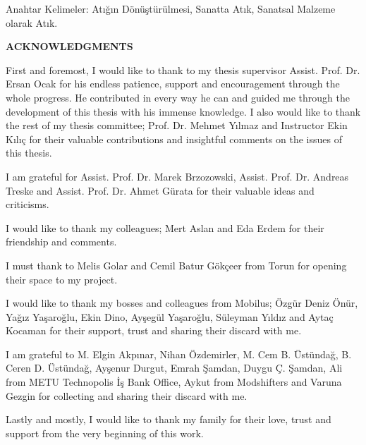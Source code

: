 \documentclass[12pt]{report}
\begin{document}
\noindent Anahtar Kelimeler: Atığın Dönüştürülmesi, Sanatta Atık, Sanatsal Malzeme olarak Atık.
\clearpage


\thispagestyle{plain}
{}
\doublespacing
\begin{center}
	\vspace*{8mm}
	{\fontsize{14pt}{14pt}\selectfont \textbf{\MakeUppercase{ACKNOWLEDGMENTS}}}\\
    \vspace{3\baselineskip}
\end{center}
\par First and foremost, I would like to thank to my thesis supervisor Assist. Prof. Dr. Ersan Ocak for his endless patience, support and encouragement through the whole progress. He contributed in every way he can and guided me through the development of this thesis with his immense knowledge. I also would like to thank the rest of my thesis committee; Prof. Dr. Mehmet Yılmaz and Instructor Ekin Kılıç for their valuable contributions and insightful comments on the issues of this thesis.

I am grateful for Assist. Prof. Dr. Marek Brzozowski, Assist. Prof. Dr. Andreas Treske and Assist. Prof. Dr. Ahmet Gürata for their valuable ideas and criticisms.

I would like to thank my colleagues; Mert Aslan and Eda Erdem for their friendship and comments. 

I must thank to Melis Golar and Cemil Batur Gökçeer from Torun for opening their space to my project. 

I would like to thank my bosses and colleagues from Mobilus; Özgür Deniz Önür, Yağız Yaşaroğlu, Ekin Dino, Ayşegül Yaşaroğlu, Süleyman Yıldız and Aytaç Kocaman for their support, trust and sharing their discard with me.

I am grateful to M. Elgin Akpınar, Nihan Özdemirler, M. Cem B. Üstündağ, B. Ceren D. Üstündağ, Ayşenur Durgut, Emrah Şamdan, Duygu Ç. Şamdan, Ali from METU Technopolis İş Bank Office, Aykut from Modshifters and Varuna Gezgin for collecting and sharing their discard with me. 

Lastly and mostly, I would like to thank my family for their love, trust and support from the very beginning of this work. 
\clearpage
\end{document}
